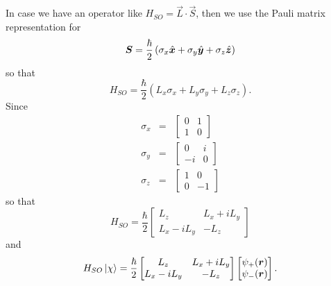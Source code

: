 In case we have an operator like $H_{SO}=\vec{L}\cdot\vec{S}$,
then we use the Pauli matrix representation for 
\begin{equation}\label{c2e7}
\bm{S} = \frac{\hbar}{2}\left(\sigma_x\hat{\bm{x}} + \sigma_y\hat{\bm{y}} +
\sigma_z\hat{\bm{z}}\right)
\end{equation}
so that
\begin{equation}\label{c2e8}
H_{SO}=\frac{\hbar}{2}\left(L_x\sigma_x + L_y\sigma_y + L_z\sigma_z\right).
\end{equation}
Since
\begin{eqnarray}
\sigma_x &=& \begin{bmatrix}0 & 1 \\ 1 & 0\end{bmatrix} \label{c2e9} \\
\sigma_y &=& \begin{bmatrix}0 & i \\ -i & 0 \end{bmatrix} \label{c2e10} \\
\sigma_z &=& \begin{bmatrix}1 & 0 \\ 0 & -1 \end{bmatrix}\label{c2e11} 
\end{eqnarray}
so that
\begin{equation}\label{c2e12}
H_{SO} = \frac{\hbar}{2}\begin{bmatrix}
L_z & L_x + iL_y \\
L_x - iL_y & -L_z
\end{bmatrix}
\end{equation}
and
\begin{equation}\label{c2e13}
H_{SO}\ket{\chi} = \frac{\hbar}{2}\begin{bmatrix}
L_z & L_x + iL_y \\
L_x - iL_y & -L_z
\end{bmatrix}\begin{bmatrix}\psi_+(\bm{r}) \\ \psi_-(\bm{r})\end{bmatrix}.
\end{equation}

